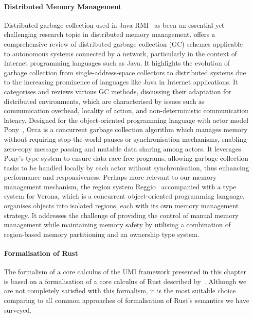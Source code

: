 \paragraph*{Distributed Memory Management}
Distributed garbage collection used in Java RMI~\citep{10.5555/1268049.1268066} as been an essential yet challenging research topic in distributed memory management. \citet{10.1145/292469.292471} offers a comprehensive review of distributed garbage collection (GC) schemes applicable to autonomous systems connected by a network, particularly in the context of Internet programming languages such as Java. It highlights the evolution of garbage collection from single-address-space collectors to distributed systems due to the increasing prominence of languages like Java in Internet applications. It categorises and reviews various GC methods, discussing their adaptation for distributed environments, which are characterised by issues such as communication overhead, locality of action, and non-deterministic communication latency. Designed for the object-oriented programming language with actor model Pony~\citep{10.1145/3133896}, Orca is a concurrent garbage collection algorithm which manages memory without requiring stop-the-world pauses or synchronisation mechanisms, enabling zero-copy message passing and mutable data sharing among actors. It leverages Pony's type system to ensure data race-free programs, allowing garbage collection tasks to be handled locally by each actor without synchronisation, thus enhancing performance and responsiveness.
Perhaps more relevant to our memory management mechanism, the region system Reggio~\citep{10.1145/3622846} accompanied with a type system for Verona, which is a concurrent object-oriented programming language, organises objects into isolated regions, each with its own memory management strategy. It addresses the challenge of providing the control of manual memory management while maintaining memory safety by utilising a combination of region-based memory partitioning and an ownership type system.

\paragraph*{Formalisation of Rust}
The formalism of a core calculus of the UMI framework presented in this chapter is based on a formalisation of a core calculus of Rust described by~\citet{10.1145/3443420}. Although we are not completely satisfied with this formalism, it is the most suitable choice comparing to all common approaches of formalisation of Rust's semantics we have surveyed.

